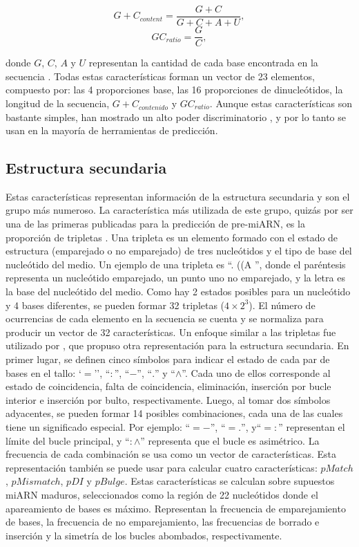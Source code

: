 \begin{equation} \label{eq:contenidoGC}
	{G+C}_{content} = \frac{G+C}{G+C+A+U},
\end{equation}
\begin{equation} \label{eq:GCratio}
	{GC}_{ratio} = \frac{G}{C},
\end{equation}

\noindent donde $G$, $C$, $A$ y $U$ representan la cantidad de cada base encontrada en la secuencia \citep{hertel2006hairpins}. Todas estas características forman un
vector de 23 elementos, compuesto por: las 4 proporciones base, las 16 proporciones de dinucleótidos, la longitud de la secuencia, ${G+C}_{contenido}$ y
${GC}_{ratio}$. Aunque estas características son bastante simples, han mostrado un alto poder discriminatorio \citep{batuwita2009micropred}, y por lo tanto se usan en la
mayoría de herramientas de predicción.

\subsection{Estructura secundaria}

Estas características representan información de la estructura secundaria y son el grupo más numeroso. La característica más utilizada de este grupo,
quizás por ser una de las primeras publicadas para la predicción de pre-miARN, es la proporción de tripletas \citep{xue2005classification}. Una tripleta es un elemento
formado con el estado de estructura (emparejado o no emparejado) de tres nucleótidos y el tipo de base del nucleótido del medio. Un ejemplo de una tripleta
es ``. ((A '', donde el paréntesis representa un nucleótido emparejado, un punto uno no emparejado, y la letra es la base del nucleótido del medio. Como hay
2 estados posibles para un nucleótido y 4 bases diferentes, se pueden formar 32 tripletas ($4\times2^{3} $). El número de ocurrencias de cada elemento
 en la secuencia se cuenta y se normaliza para producir un vector de 32 características. Un enfoque similar a las tripletas fue utilizado por
\cite{huang2007mirfinder}, que propuso otra representación para la estructura secundaria. En primer lugar, se definen cinco símbolos para indicar el estado de cada par
de bases en el tallo: `$=$'', ``$:$'', ``$-$'', ``$.$'' y ``$\wedge$''. Cada uno de ellos corresponde al estado de coincidencia, falta de coincidencia,
eliminación, inserción por bucle interior e inserción por bulto, respectivamente. Luego, al tomar dos símbolos adyacentes, se pueden formar 14 posibles
combinaciones, cada una de las cuales tiene un significado especial. Por ejemplo: ``$=-$'', ``$=.$'', y``$=:$'' representan el límite del bucle principal, y
``$:\wedge$'' representa que el bucle es asimétrico. La frecuencia de cada combinación se usa como un vector de características. Esta representación
también se puede usar para calcular cuatro características: $pMatch$, $pMismatch$, $pDI$ y $pBulge$. Estas características se calculan sobre supuestos miARN
maduros, seleccionados como la región de 22 nucleótidos donde el apareamiento de bases es máximo. Representan la frecuencia de emparejamiento de bases, la
frecuencia de no emparejamiento, las frecuencias de borrado e inserción y la simetría de los bucles abombados, respectivamente.

